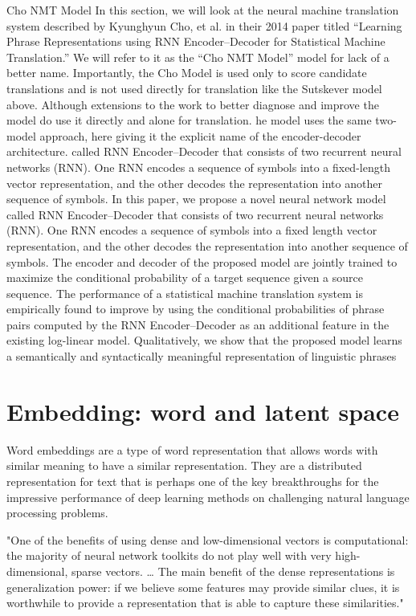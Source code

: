 Cho NMT Model \cite{Cho2014}
In this section, we will look at the neural machine translation system described by Kyunghyun Cho, et al. in their 2014 paper titled “Learning Phrase Representations using RNN Encoder–Decoder for Statistical Machine Translation.” We will refer to it as the “Cho NMT Model” model for lack of a better name.
Importantly, the Cho Model is used only to score candidate translations and is not used directly for translation like the Sutskever model above. Although extensions to the work to better diagnose and improve the model do use it directly and alone for translation.
he model uses the same two-model approach, here giving it the explicit name of the encoder-decoder architecture. called RNN Encoder–Decoder that consists of two recurrent neural networks (RNN). One RNN encodes a sequence of symbols into a fixed-length vector representation, and the other decodes the representation into another sequence of symbols. 
In  this  paper,  we  propose  a  novel  neural network model called RNN Encoder–Decoder  that  consists  of  two  recurrent neural  networks  (RNN).  One  RNN  encodes a sequence of symbols into a fixed length vector representation, and the other decodes the representation into another sequence of symbols.  The encoder and decoder  of  the  proposed  model  are  jointly trained to maximize the conditional probability of a target sequence given a source sequence.   The performance of a statistical machine translation system is empirically found to improve by using the conditional probabilities of phrase pairs computed by the RNN Encoder–Decoder as an additional feature in the existing log-linear model.    Qualitatively,  we  show  that  the proposed model learns a semantically and syntactically meaningful representation of linguistic phrases


\section{Embedding: word and latent space}

Word embeddings are a type of word representation that allows words with similar meaning to have a similar representation.
They are a distributed representation for text that is perhaps one of the key breakthroughs for the impressive performance of deep learning methods on challenging natural language processing problems.

"One of the benefits of using dense and low-dimensional vectors is computational: the majority of neural network toolkits do not play well with very high-dimensional, sparse vectors. … The main benefit of the dense representations is generalization power: if we believe some features may provide similar clues, it is worthwhile to provide a representation that is able to capture these similarities."

